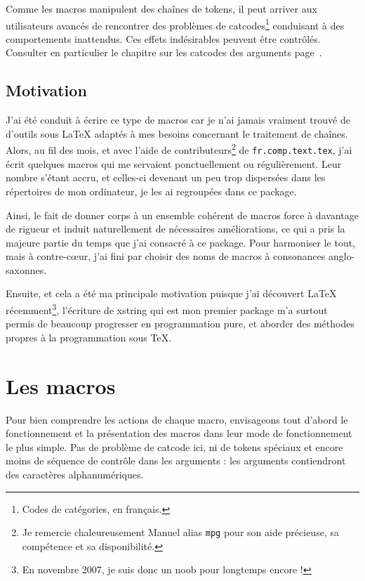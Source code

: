 \documentclass[a4paper,10pt]{article}
\newcommand\guill[1]{\og{}#1\fg{}}
\newcommand\Xstring{\textsf{xstring}\xspace}
\begin{document}
Comme les macros manipulent des chaînes de tokens, il peut arriver aux utilisateurs avancés de rencontrer des problèmes de \guill{catcodes\footnote{Codes de catégories, en français.}} conduisant à des comportements inattendus. Ces effets indésirables peuvent être contrôlés. Consulter en particulier le chapitre sur les catcodes des arguments page~\pageref{macrosetoilees}.

\subsection{Motivation}
J'ai été conduit à écrire ce type de macros car je n'ai jamais vraiment trouvé de d'outils sous \LaTeX{} adaptés à mes besoins concernant le traitement de chaînes. Alors, au fil des mois, et avec l'aide de contributeurs\footnote{Je remercie chaleureusement Manuel alias \guill{\nolinkurl{mpg}} pour son aide précieuse, sa compétence et sa disponibilité.} de \nolinkurl{fr.comp.text.tex}, j'ai écrit quelques macros qui me servaient ponctuellement ou régulièrement. Leur nombre s'étant accru, et celles-ci devenant un peu trop dispersées dans les répertoires de mon ordinateur, je les ai regroupées dans ce package.

Ainsi, le fait de donner corps à un ensemble cohérent de macros force à davantage de rigueur et induit naturellement de nécessaires améliorations, ce qui a pris la majeure partie du temps que j'ai consacré à ce package. Pour harmoniser le tout, mais à contre-cœur, j'ai fini par choisir des noms de macros à consonances anglo-saxonnes.\medskip

Ensuite, et cela a été ma principale motivation puisque j'ai découvert \LaTeX{} récemment\footnote{En novembre 2007, je suis donc un \og noob\fg{} pour longtemps encore !}, l'écriture de \Xstring qui est mon premier package m'a surtout permis de beaucoup progresser en programmation pure, et aborder des méthodes propres à la programmation sous \TeX.

\section{Les macros}
Pour bien comprendre les actions de chaque macro, envisageons tout d'abord le fonctionnement et la présentation des macros dans leur mode de fonctionnement le plus simple. Pas de problème de catcode ici, ni de tokens spéciaux et encore moins de séquence de contrôle dans les arguments : les arguments contiendront des caractères alphanumériques.\medskip
\end{document}
